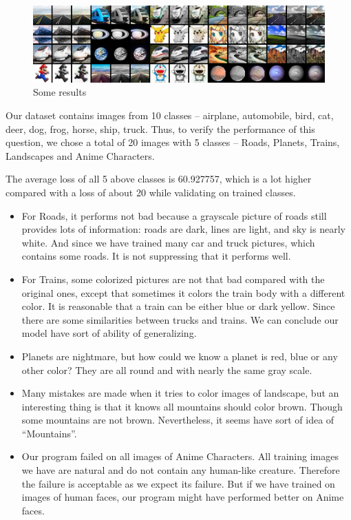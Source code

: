 \documentclass[letter]{article}
\begin{document}
\begin{itemize}
\begin{enumerate}
\begin{figure}[H]
			\centering
			\includegraphics[width=\textwidth]{figs/untrained.png}
			\caption{Some results}
			\label{untrained}
		\end{figure}
		\par{Our dataset contains images from 10 classes -- airplane, automobile, bird, cat, deer, dog, frog, horse, ship, truck. Thus, to verify the performance of this question, we chose a total of 20 images with 5 classes -- Roads, Planets, Trains, Landscapes and Anime Characters. }
		\par{The average loss of all 5 above classes is 60.927757, which is a lot higher compared with a loss of about 20 while validating on trained classes.}
		\begin{itemize}
			\item {For Roads, it performs not bad because a grayscale picture of roads still provides lots of information: roads are dark, lines are light, and sky is nearly white. And since we have trained many car and truck pictures, which contains some roads. It is not suppressing that it performs well.}
			\item {For Trains, some colorized pictures are not that bad compared with the original ones, except that sometimes it colors the train body with a different color. It is reasonable that a train can be either blue or dark yellow. Since there are some similarities between trucks and trains. We can conclude our model have sort of ability of generalizing.}
			\item {Planets are nightmare, but how could we know a planet is red, blue or any other color? They are all round and with nearly the same gray scale.}
			\item {Many mistakes are made when it tries to color images of landscape, but an interesting thing is that it knows all mountains should color brown. Though some mountains are not brown. Nevertheless, it seems have sort of idea of ``Mountains''.}
			\item {Our program failed on all images of Anime Characters. All training images we have are natural and do not contain any human-like creature. Therefore the failure is acceptable as we expect its failure. But if we have trained on images of human faces, our program might have performed better on Anime faces.}

\end{itemize}
\end{enumerate}
\end{itemize}
\end{document}
